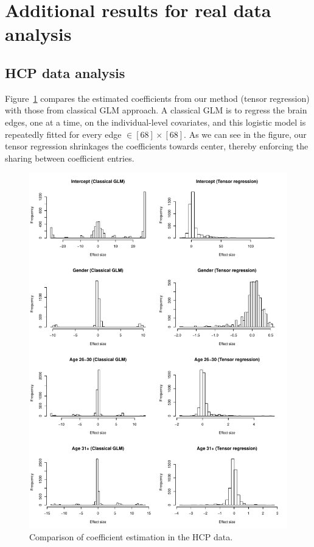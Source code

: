 \documentclass[12pt]{article}
\theoremstyle{plain}
\theoremstyle{definition}
\begin{document}
\section{Additional results for real data analysis}

\subsection{HCP data analysis}

Figure~\ref{fig:s1} compares the estimated coefficients from our method (tensor regression) with those from classical GLM approach. A classical GLM is to regress the brain edges, one at a time, on the individual-level covariates, and this logistic model is repeatedly fitted for every edge $\in [68]\times [68]$. As we can see in the figure, our tensor regression shrinkages the coefficients towards center, thereby enforcing the sharing between coefficient entries. 

\begin{figure}[t]
\includegraphics[width=17cm]{compare.pdf}
\caption{Comparison of coefficient estimation in the HCP data.}\label{fig:s1}
\end{figure}
\end{document}

